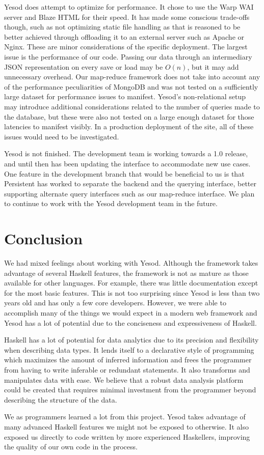 \documentclass[letterpaper,twocolumn,9pt]{article}
\begin{document}
Yesod does attempt to optimize for performance.  It chose to use the Warp WAI server and Blaze HTML for their speed.  It has made some conscious trade-offs though, such as not optimizing static file handling as that is reasoned to be better achieved through offloading it to an external server such as Apache or Nginx.  These are minor considerations of the specific deployment.  The largest issue is the performance of our code.  Passing our data through an intermediary JSON representation on every save or load may be $O(n)$, but it may add unnecessary overhead.  Our map-reduce framework does not take into account any of the performance peculiarities of MongoDB and was not tested on a sufficiently large dataset for performance issues to manifest.  Yesod's non-relational setup may introduce additional considerations related to the number of queries made to the database, but these were also not tested on a large enough dataset for those latencies to manifest visibly.  In a production deployment of the site, all of these issues would need to be investigated.

Yesod is not finished.  The development team is working towards a 1.0 release, and until then has been updating the interface to accommodate new use cases.  One feature in the development branch that would be beneficial to us is that Persistent has worked to separate the backend and the querying interface, better supporting alternate query interfaces such as our map-reduce interface.  We plan to continue to work with the Yesod development team in the future.

\section{Conclusion}
\label{conclusion}

We had mixed feelings about working with Yesod. Although the framework takes advantage of several Haskell features, the framework is not as mature as those available for other languages. For example, there was little documentation except for the most basic features. This is not too surprising since Yesod is less than two years old and has only a few core developers.  However, we were able to accomplish many of the things we would expect in a modern web framework and Yesod has a lot of potential due to the conciseness and expressiveness of Haskell.

Haskell has a lot of potential for data analytics due to its precision and flexibility when describing data types.  It lends itself to a declarative style of programming which maximizes the amount of inferred information and frees the programmer from having to write inferable or redundant statements.  It also transforms and manipulates data with ease.  We believe that a robust data analysis platform could be created that requires minimal investment from the programmer beyond describing the structure of the data.

We as programmers learned a lot from this project. Yesod takes advantage of many advanced Haskell features we might not be exposed to otherwise.  It also exposed us directly to code written by more experienced Haskellers, improving the quality of our own code in the process.

{\footnotesize 
}
\end{document}
